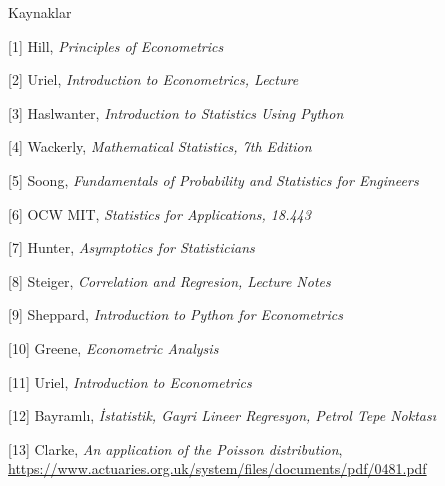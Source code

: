 \documentclass[12pt,fleqn]{article}\usepackage{../../common}
\begin{document}
Kaynaklar

[1] Hill, {\em Principles of Econometrics}

[2] Uriel, {\em Introduction to Econometrics, Lecture}

[3] Haslwanter, {\em Introduction to Statistics Using Python}

[4] Wackerly, {\em Mathematical Statistics, 7th Edition}

[5] Soong, {\em Fundamentals of Probability and Statistics for Engineers}

[6] OCW MIT, {\em Statistics for Applications, 18.443}

[7] Hunter, {\em Asymptotics for Statisticians}

[8] Steiger, {\em Correlation and Regresion, Lecture Notes}

[9] Sheppard, {\em Introduction to Python for Econometrics}

[10] Greene, {\em Econometric Analysis}

[11] Uriel, {\em Introduction to Econometrics}

[12] Bayramlı, {\em İstatistik, Gayri Lineer Regresyon, Petrol Tepe Noktası}

[13] Clarke, {\em An application of the Poisson distribution},
     \url{https://www.actuaries.org.uk/system/files/documents/pdf/0481.pdf}
\end{document}
